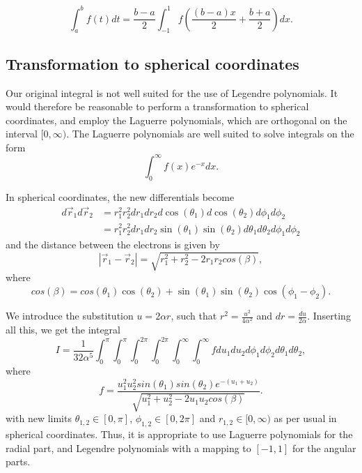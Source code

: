 \documentclass{emulateapj}
\begin{document}
\begin{equation*}
  \int_a^bf(t)dt=\frac{b-a}{2}\int_{-1}^1f\left(\frac{(b-a)x}{2}+\frac{b+a}{2}\right)dx.
\end{equation*}

\subsection{Transformation to spherical coordinates}
Our original integral is not well suited for the use of Legendre polynomials. It would therefore be reasonable to perform a transformation to spherical coordinates, and employ the Laguerre polynomials, which are orthogonal on the interval $[0,\infty)$. The Laguerre polynomials are well suited to solve integrals on the form
\begin{equation}
    \int_0^\infty f(x) e^{-x} dx.
\end{equation}

In spherical coordinates, the new differentials become
\begin{align*}
    d\vec{r}_1d\vec{r}_2 &= r_1^2r_2^2 dr_1dr_2 d\cos(\theta_1)d\cos(\theta_2) d\phi_1d\phi_2 \\
    &= r_1^2r_2^2 dr_1dr_2\sin(\theta_1)\sin(\theta_2)d\theta_1d\theta_2d\phi_1d\phi_2
\end{align*}
and the distance between the electrons is given by
\begin{equation*}
|\vec{r}_1 - \vec{r}_2| = \sqrt{r_1^2 + r_2^2 - 2r_1r_2cos(\beta)},
\end{equation*}
where
\begin{equation*}
cos(\beta) = cos(\theta_1)\cos(\theta_2) + \sin(\theta_1)\sin(\theta_2)\cos(\phi_1 - \phi_2).
\end{equation*}

We introduce the substitution $u = 2\alpha r$, such that $r^2 = \frac{u^2}{4\alpha^2}$ and $dr = \frac{du}{2\alpha}$. Inserting all this, we get the integral
\begin{equation}
    I = \frac{1}{32\alpha^5}\int_0^\pi \int_0^\pi \int_0^{2\pi} \int_0^{2\pi} \int_0^{\infty} \int_0^{\infty} f du_1 du_2 d\phi_1 d\phi_2 d\theta_1 d\theta_2,
\end{equation}
where
\begin{equation}
    f = \frac{u_1^2 u_2^2 sin\left(\theta_1\right) sin\left(\theta_2\right) e^{-\left(u_1+u_2\right)}}{\sqrt{u_1^2 + u_2^2 - 2u_1u_2cos\left(\beta\right)}}.
\end{equation}
with new limits $\theta_{1,2} \in [0,\pi]$, $\phi_{1,2} \in [0,2\pi]$ and $r_{1,2} \in [0,\infty)$ as per usual in spherical coordinates. Thus, it is appropriate to use Laguerre polynomials for the radial part, and Legendre polynomials with a mapping to $[-1,1]$ for the angular parts.
\end{document}
